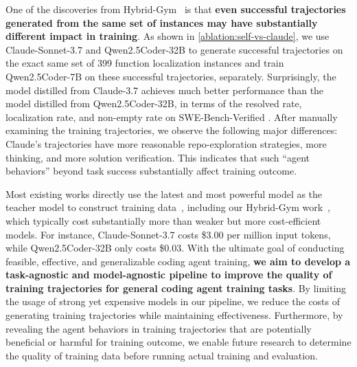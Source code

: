 One of the discoveries from Hybrid-Gym~\cite {hybrid-gym} is that \textbf{even successful trajectories generated from the same set of instances may have substantially different impact in training}.
As shown in \autoref{ablation:self-vs-claude}, we use Claude-Sonnet-3.7 and Qwen2.5Coder-32B to generate successful trajectories on the exact same set of 399 function localization instances and train Qwen2.5Coder-7B on these successful trajectories, separately.
Surprisingly, the model distilled from Claude-3.7 achieves much better performance than the model distilled from Qwen2.5Coder-32B, in terms of the resolved rate, localization rate, and non-empty rate on SWE-Bench-Verified \cite{swebench}.
After manually examining the training trajectories, we observe the following major differences: Claude's trajectories have more reasonable repo-exploration strategies, more thinking, and more solution verification. This indicates that such ``agent behaviors'' beyond task success substantially affect training outcome.

Most existing works directly use the latest and most powerful model as the teacher model to construct training data~\cite{swegym,R2EGym,swe-smith,swe-play}, including our Hybrid-Gym work~\cite{hybrid-gym}, which typically cost substantially more than weaker but more cost-efficient models. 
For instance, Claude-Sonnet-3.7 costs \$3.00 per million input tokens, while Qwen2.5Coder-32B only costs \$0.03.
With the ultimate goal of conducting feasible, effective, and generalizable coding agent training, \textbf{we aim to develop a task-agnostic and model-agnostic pipeline to improve the quality of training trajectories for general coding agent training tasks}. 
By limiting the usage of strong yet expensive models in our pipeline, we reduce the costs of generating training trajectories while maintaining effectiveness.
Furthermore, by revealing the agent behaviors in training trajectories that are potentially beneficial or harmful for training outcome, we enable future research to determine the quality of training data before running actual training and evaluation.

